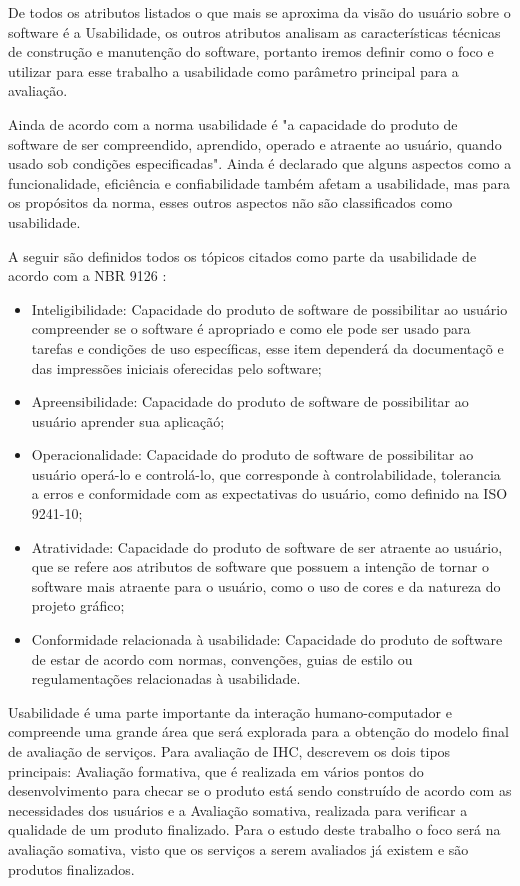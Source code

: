 De todos os atributos listados o que mais se aproxima da visão do usuário sobre o software é a Usabilidade, os outros atributos analisam as características técnicas de construção e manutenção do software, portanto iremos definir como o foco e utilizar para esse trabalho a usabilidade como parâmetro principal para a avaliação.

Ainda de acordo com a norma \cite{iso9126} usabilidade é "a capacidade do produto de software de ser compreendido, aprendido, operado e atraente ao usuário, quando usado sob condições especificadas". Ainda é declarado que alguns aspectos como a funcionalidade, eficiência e confiabilidade também afetam a usabilidade, mas para os propósitos da norma, esses outros aspectos não são classificados como usabilidade.

A seguir são definidos todos os tópicos citados como parte da usabilidade de acordo com a NBR 9126 \cite{iso9126}:
\begin{itemize}
	\item Inteligibilidade: Capacidade do produto de software de possibilitar ao usuário compreender se o software é apropriado e como ele pode ser
usado para tarefas e condições de uso específicas, esse item dependerá da documentaçõ e das impressões iniciais oferecidas pelo software;
	\item Apreensibilidade: Capacidade do produto de software de possibilitar ao usuário aprender sua aplicaçãó;
	\item Operacionalidade: Capacidade do produto de software de possibilitar ao usuário operá-lo e controlá-lo, que corresponde à controlabilidade, tolerancia a erros e conformidade com as expectativas do usuário, como definido na ISO 9241-10;
	\item Atratividade: Capacidade do produto de software de ser atraente ao usuário, que se refere aos atributos de software que possuem a intenção de tornar o software mais atraente para o usuário, como o uso de cores e da natureza do projeto gráfico;
	\item Conformidade relacionada à usabilidade: Capacidade do produto de software de estar de acordo com normas, convenções, guias de estilo ou regulamentações
relacionadas à usabilidade.
\end{itemize}

Usabilidade é uma parte importante da interação humano-computador e compreende uma grande área que será explorada para a obtenção do modelo final de avaliação de serviços. Para avaliação de IHC, \cite{preece2005} descrevem os dois tipos principais: Avaliação formativa, que é realizada em vários pontos do desenvolvimento para checar se o produto está sendo construído de acordo com as necessidades dos usuários e a Avaliação somativa, realizada para verificar a qualidade de um produto finalizado. Para o estudo deste trabalho o foco será na avaliação somativa, visto que os serviços a serem avaliados já existem e são produtos finalizados.

